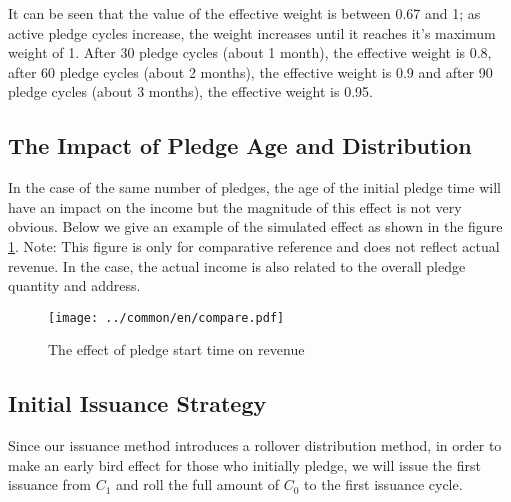 It can be seen that the value of the effective weight is between 0.67 and 1; as active pledge cycles increase, the weight increases until it reaches it's maximum weight of 1. After 30 pledge cycles (about 1 month), the effective weight is 0.8, after 60 pledge cycles (about 2 months), the effective weight is 0.9 and after 90 pledge cycles (about 3 months), the effective weight is 0.95.

\subsection{The Impact of Pledge Age and Distribution}
In the case of the same number of pledges, the age of the initial pledge time will have an impact on the income but the magnitude of this effect is not very obvious. Below we give an example of the simulated effect as shown in the figure \ref{fig:compare}. Note: This figure is only for comparative reference and does not reflect actual revenue. In the case, the actual income is also related to the overall pledge quantity and address.
\begin{figure}[htbp]
  \centering
    \texttt{[image: ../common/en/compare.pdf]}
    \caption{The effect of pledge start time on revenue\label{fig:compare}}
\end{figure}

\subsection{Initial Issuance Strategy}
Since our issuance method introduces a rollover distribution method, in order to make an early bird effect for those who initially pledge, we will issue the first issuance from $C_1$ and roll the full amount of $C_0$ to the first issuance cycle.
